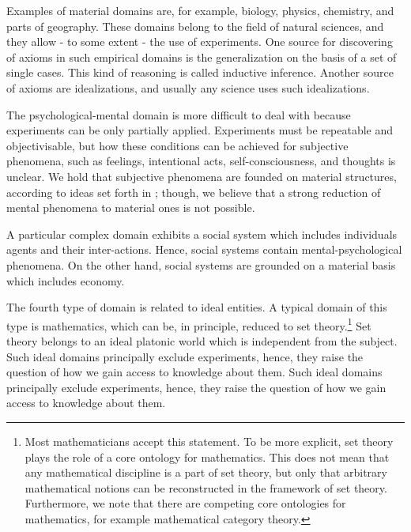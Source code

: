 \documentclass{ao2e}
\begin{document}
Examples of material domains are, for example,  biology, physics, chemistry, and parts of geography.  These domains belong to the field of natural sciences, and they allow -  to some extent - the use of experiments. One source for discovering of axioms in such empirical domains is the generalization on the basis of a set of single cases. This kind of reasoning is called inductive inference. Another source of axioms are idealizations, and usually any science uses such idealizations. 

The psychological-mental domain is more difficult to deal with because experiments can be only partially applied. Experiments must be repeatable and objectivisable, but how these conditions can be achieved for subjective phenomena, such as feelings, intentional acts, self-consciousness, and thoughts is unclear. We hold that subjective phenomena are 
founded on material structures, according to ideas set forth in \cite{kandel-e-1998-a}; though, we believe that a strong reduction of mental phenomena to material ones
is not possible.

A particular complex domain exhibits a social system which includes individuals agents and their inter-actions. Hence, social systems contain mental-psychological phenomena.
On the other hand, social systems are grounded on a material basis which includes economy.

The fourth type of domain is related to ideal entities. A typical domain of this type is mathematics, which can be, in principle, reduced to set theory.\footnote{Most mathematicians accept this statement. To be more explicit, set theory plays the role of a core ontology for mathematics. This does not mean that any mathematical discipline
is a part of set theory, but only that arbitrary mathematical notions can be reconstructed in the framework of set theory. Furthermore, we note that there are competing core ontologies for mathematics, for example mathematical category theory.} Set theory belongs to an ideal platonic world which is independent from the subject. Such ideal domains principally exclude experiments, hence, they raise the question of how we gain access to knowledge about them. Such ideal domains principally exclude experiments, hence, they raise the question of how we gain access to knowledge about them.
\end{document}
